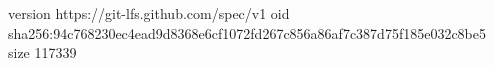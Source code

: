 version https://git-lfs.github.com/spec/v1
oid sha256:94c768230ec4ead9d8368e6cf1072fd267c856a86af7c387d75f185e032c8be5
size 117339
